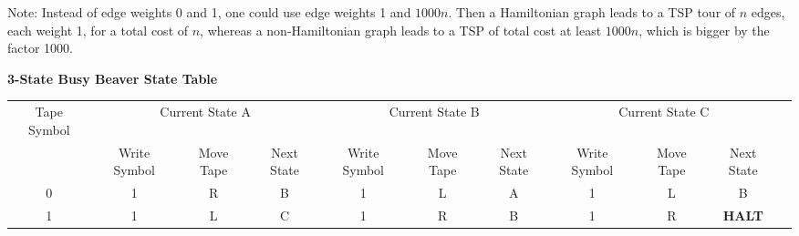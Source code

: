 \documentclass[2pt]{scrartcl}
\begin{document}
\begin{multicols}{6}
\begin{enumerate}
Note:  Instead of edge weights 0 and 1, one could use edge weights 1
and $1000n$.  Then a Hamiltonian graph leads to a TSP tour of $n$
edges, each weight 1, for a total cost of $n$, whereas a
non-Hamiltonian graph leads to a TSP of total cost at least $1000n$,
which is bigger by the factor 1000.
\end{enumerate}

  \end{multicols}


  {\bf 3-State Busy Beaver State Table}

  \begin{tabular}{|c|c|c|c|c|c|c|c|c|c|c|}
    \hline
    Tape Symbol & \multicolumn{3}{|c|}{Current State A} & \multicolumn{3}{|c|}{Current State B} & \multicolumn{3}{|c|}{Current State C} \\
                & Write Symbol & Move Tape & Next State & Write Symbol & Move Tape & Next State & Write Symbol & Move Tape & Next State\\
    \hline
    0 & 1 & R & B & 1 & L & A & 1 & L & B\\
    1 & 1 & L & C & 1 & R & B & 1 & R & {\bf HALT}\\
    \hline
  \end{tabular}
  
\end{document}
